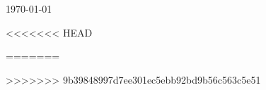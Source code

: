 \documentclass[11pt, a4paper]{russell}
\begin{document}
\makecvheader

\makecvfooter
  {\today}
  {}
  {\thepage}


<<<<<<< HEAD
% 
% 
% 

% 

% 
% 
% 
=======


















>>>>>>> 9b39848997d7ee301ec5ebb92bd9b56c563c5e51


% 

% 

% 

% 


\vspace*{\fill}
\end{document}

